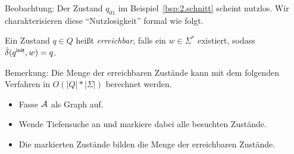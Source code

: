 % 
% 

Beobachtung: Der Zustand $q_{01}$ im Beispiel~\ref{bsp:2.schnitt} scheint nutzlos. Wir charakterisieren diese "`Nutzlosigkeit"' formal wie folgt.

\begin{Def}
  Ein Zustand $q \in Q$ heißt \emph{erreichbar}, falls ein $w \in \Sigma^*$ existiert, sodass $\hat \delta(q^\mathsf{init}, w) = q$.
\end{Def}
Bemerkung: Die Menge der erreichbaren Zustände kann mit dem folgenden Verfahren in $O(|Q|*|\Sigma|)$ berechnet werden.
  \begin{itemize}
  \item Fasse $\mathcal{A}$ als Graph auf.
  \item Wende Tiefensuche an und markiere dabei alle besuchten Zustände.
  \item Die markierten Zustände bilden die Menge der erreichbaren Zustände.
  \end{itemize}



